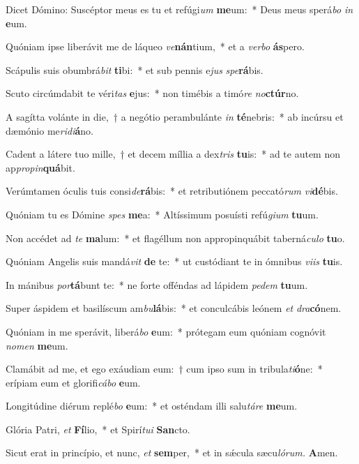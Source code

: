 \item Dicet Dómino: Suscéptor meus es tu et refúgi\textit{um} \textbf{me}um:~* Deus meus sperá\textit{bo} \textit{in} \textbf{e}um.
\item Quóniam ipse liberávit me de láqueo \textit{ve}\textbf{nán}tium,~* et a \textit{verbo} \textbf{ás}pero.
\item Scápulis suis obumbrá\textit{bit} \textbf{ti}bi:~* et sub pennis e\textit{jus} \textit{spe}\textbf{rá}bis.
\item Scuto circúmdabit te véri\textit{tas} \textbf{e}jus:~* non timébis a timó\textit{re} \textit{no}\textbf{ctúr}no.
\item A sagítta volánte in die,~† a negótio perambulánte \textit{in} \textbf{té}nebris:~* ab incúrsu et dæmónio me\textit{ridi}\textbf{á}no.
\item Cadent a látere tuo mille,~† et decem míllia a dex\textit{tris} \textbf{tu}is:~* ad te autem non ap\textit{propin}\textbf{quá}bit.
\item Verúmtamen óculis tuis consi\textit{de}\textbf{rá}bis:~* et retributiónem peccató\textit{rum} \textit{vi}\textbf{dé}bis.
\item Quóniam tu es Dómine \textit{spes} \textbf{me}a:~* Altíssimum posuísti refú\textit{gium} \textbf{tu}um.
\item Non accédet ad \textit{te} \textbf{ma}lum:~* et flagéllum non appropinquábit taberná\textit{culo} \textbf{tu}o.
\item Quóniam Angelis suis mandá\textit{vit} \textbf{de} te:~* ut custódiant te in ómnibus \textit{viis} \textbf{tu}is.
\item In mánibus \textit{por}\textbf{tá}bunt te:~* ne forte offéndas ad lápidem \textit{pedem} \textbf{tu}um.
\item Super áspidem et basilíscum am\textit{bu}\textbf{lá}bis:~* et conculcábis leónem \textit{et} \textit{dra}\textbf{có}nem.
\item Quóniam in me sperávit, liberá\textit{bo} \textbf{e}um:~* prótegam eum quóniam cognóvit \textit{nomen} \textbf{me}um.
\item Clamábit ad me, et ego exáudiam eum:~† cum ipso sum in tribula\textit{ti}\textbf{ó}ne:~* erípiam eum et glorifi\textit{cábo} \textbf{e}um.
\item Longitúdine diérum replé\textit{bo} \textbf{e}um:~* et osténdam illi salu\tinyhspace\textit{táre} \textbf{me}um.
\item Glória Patri, \textit{et} \textbf{Fí}lio,~* et Spirí\tinyhspace\textit{tui} \textbf{San}cto.
\item Sicut erat in princípio, et nunc, \textit{et} \textbf{sem}per,~* et in sǽcula sæcu\tinyhspace\textit{lórum.} \textbf{A}men.